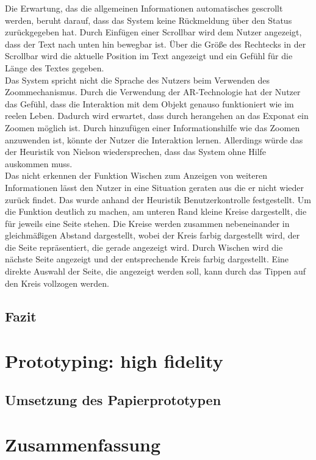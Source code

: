 \documentclass[runningheads,a4paper]{llncs}
\begin{document}
Die Erwartung, das die allgemeinen Informationen automatisches gescrollt werden, beruht darauf, dass das System keine Rückmeldung über den Status zurückgegeben hat. Durch Einfügen einer Scrollbar wird dem Nutzer angezeigt, dass der Text nach unten hin bewegbar ist. Über die Größe des Rechtecks in der Scrollbar wird die aktuelle Position im Text angezeigt und ein Gefühl für die Länge des Textes gegeben.\\

Das System spricht nicht die Sprache des Nutzers beim Verwenden des Zoommechanismus. Durch die Verwendung der AR-Technologie hat der Nutzer das Gefühl, dass die Interaktion mit dem Objekt genauso funktioniert wie im reelen Leben. Dadurch wird erwartet, dass durch herangehen an das Exponat ein Zoomen möglich ist. Durch hinzufügen einer Informationshilfe wie das Zoomen anzuwenden ist, könnte der Nutzer die Interaktion lernen. Allerdings würde das der Heuristik von Nielson wiedersprechen, dass das System ohne Hilfe auskommen muss.\\

Das nicht erkennen der Funktion Wischen zum Anzeigen von weiteren Informationen lässt den Nutzer in eine Situation geraten aus die er nicht wieder zurück findet. Das wurde anhand der Heuristik Benutzerkontrolle festgestellt. Um die Funktion deutlich zu machen, am unteren Rand kleine Kreise dargestellt, die für jeweils eine Seite stehen. Die Kreise werden zusammen nebeneinander in gleichmäßigen Abstand dargestellt, wobei der Kreis farbig dargestellt wird, der die Seite repräsentiert, die gerade angezeigt wird. Durch Wischen wird die nächste Seite angezeigt und der entsprechende Kreis farbig dargestellt. Eine direkte Auswahl der Seite, die angezeigt werden soll, kann durch das Tippen auf den Kreis vollzogen werden.\\

\subsection{Fazit}


\section{Prototyping: high fidelity}
\subsection{Umsetzung des Papierprototypen}

\section{Zusammenfassung}


\newpage
 

\end{document}
